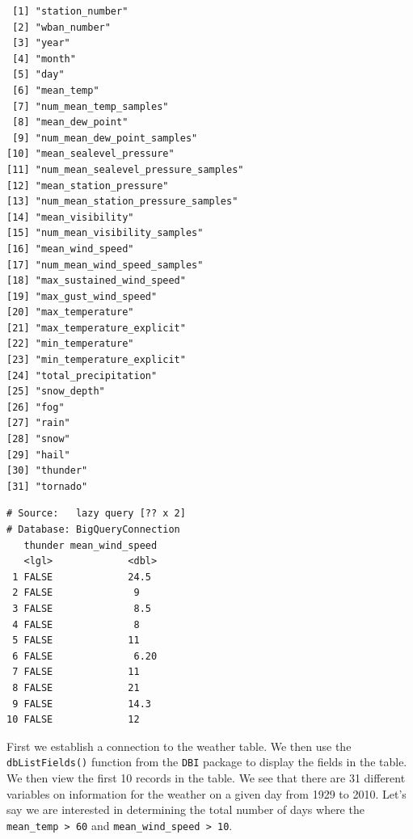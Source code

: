\documentclass[]{krantz}
\makeatletter
\newenvironment{Shaded}{\begin{snugshade}}{\end{snugshade}}
\newcommand{\DecValTok}[1]{\textcolor[rgb]{0.06,0.06,0.06}{#1}}
\newcommand{\KeywordTok}[1]{\textcolor[rgb]{0.27,0.27,0.27}{\textbf{#1}}}
\newcommand{\NormalTok}[1]{#1}
\newcommand{\OperatorTok}[1]{\textcolor[rgb]{0.43,0.43,0.43}{\textbf{#1}}}
\newcommand{\StringTok}[1]{\textcolor[rgb]{0.5,0.5,0.5}{#1}}
\newenvironment{kframe}{%
\medskip{}
\setlength{\fboxsep}{.8em}
 \def\at@end@of@kframe{}%
 \ifinner\ifhmode%
  \def\at@end@of@kframe{\end{minipage}}%
  \begin{minipage}{\columnwidth}%
 \fi\fi%
 \def\FrameCommand##1{\hskip\@totalleftmargin \hskip-\fboxsep
 \colorbox{shadecolor}{##1}\hskip-\fboxsep
     \hskip-\linewidth \hskip-\@totalleftmargin \hskip\columnwidth}%
 \MakeFramed {\advance\hsize-\width
   \@totalleftmargin\z@ \linewidth\hsize
   \@setminipage}}%
 {\par\unskip\endMakeFramed%
 \at@end@of@kframe}
\renewenvironment{Shaded}{\begin{kframe}}{\end{kframe}}
\makeatother
\begin{document}
\begin{verbatim}
 [1] "station_number"                    
 [2] "wban_number"                       
 [3] "year"                              
 [4] "month"                             
 [5] "day"                               
 [6] "mean_temp"                         
 [7] "num_mean_temp_samples"             
 [8] "mean_dew_point"                    
 [9] "num_mean_dew_point_samples"        
[10] "mean_sealevel_pressure"            
[11] "num_mean_sealevel_pressure_samples"
[12] "mean_station_pressure"             
[13] "num_mean_station_pressure_samples" 
[14] "mean_visibility"                   
[15] "num_mean_visibility_samples"       
[16] "mean_wind_speed"                   
[17] "num_mean_wind_speed_samples"       
[18] "max_sustained_wind_speed"          
[19] "max_gust_wind_speed"               
[20] "max_temperature"                   
[21] "max_temperature_explicit"          
[22] "min_temperature"                   
[23] "min_temperature_explicit"          
[24] "total_precipitation"               
[25] "snow_depth"                        
[26] "fog"                               
[27] "rain"                              
[28] "snow"                              
[29] "hail"                              
[30] "thunder"                           
[31] "tornado"                           
\end{verbatim}

\begin{Shaded}
\end{Shaded}

\begin{verbatim}
# Source:   lazy query [?? x 2]
# Database: BigQueryConnection
   thunder mean_wind_speed
   <lgl>             <dbl>
 1 FALSE             24.5 
 2 FALSE              9   
 3 FALSE              8.5 
 4 FALSE              8   
 5 FALSE             11   
 6 FALSE              6.20
 7 FALSE             11   
 8 FALSE             21   
 9 FALSE             14.3 
10 FALSE             12   
\end{verbatim}

First we establish a connection to the weather table. We then use the \texttt{dbListFields()} function from the \texttt{DBI} package to display the fields in the table. We then view the first 10 records in the table. We see that there are 31 different variables on information for the weather on a given day from 1929 to 2010. Let's say we are interested in determining the total number of days where the \texttt{mean\_temp\ \textgreater{}\ 60} and \texttt{mean\_wind\_speed\ \textgreater{}\ 10}.
\end{document}
